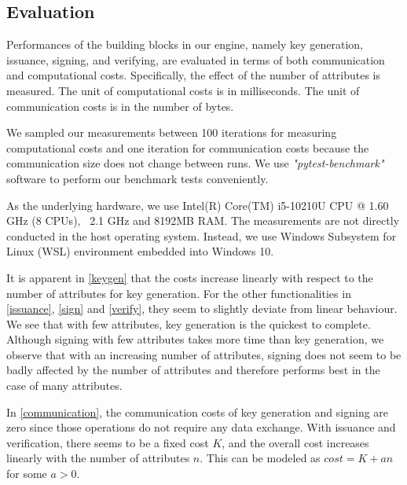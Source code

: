 \documentclass[9pt,conference]{IEEEtran}
\begin{document}
\subsection{Evaluation}
Performances of the building blocks in our engine, namely key generation, issuance, signing, and verifying, are evaluated in terms of both communication and computational costs. Specifically, the effect of the number of attributes is measured. The unit of computational costs is in milliseconds. The unit of communication costs is in the number of bytes.

We sampled our measurements between 100 iterations for measuring computational costs and one iteration for communication costs because the communication size does not change between runs. We use \textit{"pytest-benchmark"}\cite{pytestbenchmark} software to perform our benchmark tests conveniently.

As the underlying hardware, we use Intel(R) Core(TM) i5-10210U CPU @ 1.60 GHz (8 CPUs), ~2.1 GHz and 8192MB RAM. The measurements are not directly conducted in the host operating system. Instead, we use Windows Subsystem for Linux (WSL) environment embedded into Windows 10.

It is apparent in \autoref{keygen} that the costs increase linearly with respect to the number of attributes for key generation. For the other functionalities in \autoref{issuance}, \autoref{sign} and \autoref{verify}, they seem to slightly deviate from linear behaviour. We see that with few attributes, key generation is the quickest to complete. Although signing with few attributes takes more time than key generation, we observe that with an increasing number of attributes, signing does not seem to be badly affected by the number of attributes and therefore performs best in the case of many attributes.

In \autoref{communication}, the communication costs of key generation and signing are zero since those operations do not require any data exchange. With issuance and verification, there seems to be a fixed cost $K$, and the overall cost increases linearly with the number of attributes $n$. This can be modeled as $cost=K+an$ for some $a>0$.
\end{document}
